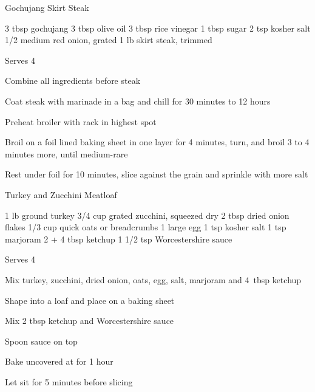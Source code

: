 \begin{recipe}{Gochujang Skirt Steak}{}
\begin{ingredients}
3 tbsp gochujang
3 tbsp olive oil
3 tbsp rice vinegar
1 tbsp sugar
2 tsp kosher salt
1/2 medium red onion, grated
1 lb skirt steak, \ibreak trimmed
\end{ingredients}
\nextcolumn
Serves 4
\begin{steps}
    \item Combine all ingredients before steak
    \item Coat steak with marinade in a bag and chill for 30 minutes to 12 hours
    \item Preheat broiler with rack in highest spot
    \item Broil on a foil lined baking sheet in one layer for 4 minutes, turn, and broil 3 to 4 minutes more, until medium-rare
    \item Rest under foil for 10 minutes, slice against the grain and sprinkle with more salt
\end{steps}
\end{recipe}

\begin{denserecipe}{Turkey and Zucchini Meatloaf}{}
\begin{ingredients}
1 lb ground turkey
3/4 cup grated zucchini, squeezed dry
2 tbsp dried onion flakes
1/3 cup quick oats or breadcrumbs
1 large egg
1 tsp kosher salt
1 tsp marjoram
2 + 4 tbsp ketchup
1 1/2 tsp Worcestershire sauce
\end{ingredients}
\nextcolumn
Serves 4
\begin{steps}
\item Mix turkey, zucchini, dried onion, oats, egg, salt, marjoram and 4~tbsp ketchup
\item Shape into a loaf and place on a baking sheet
\item Mix 2 tbsp ketchup and Worcestershire sauce
\item Spoon sauce on top
\item Bake uncovered at  for 1 hour
\item Let sit for 5 minutes before slicing
\end{steps}
\end{denserecipe}

